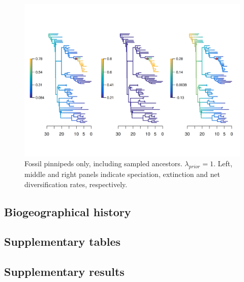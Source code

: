 \documentclass[a4paper, 12pt]{article}
\begin{document}
\begin{figure}[H]
  \centering
  \includegraphics[width = \linewidth]{figures/diversification/fossil-only-with-sampled-ancestors/sensitivity-analysis-fossil-only-full.png}
  \caption{Fossil pinnipeds only, including sampled ancestors. $\lambda_{prior} = 1$. Left, middle and right panels indicate speciation, extinction and net diversification rates, respectively.}
  \label{fig-fossil-only-full}
\end{figure}


\newpage
\begin{landscape}
\section{Biogeographical history}
\subsection{Supplementary tables}



\newpage


\newpage

\end{landscape}
\subsection{Supplementary results}
\end{document}
